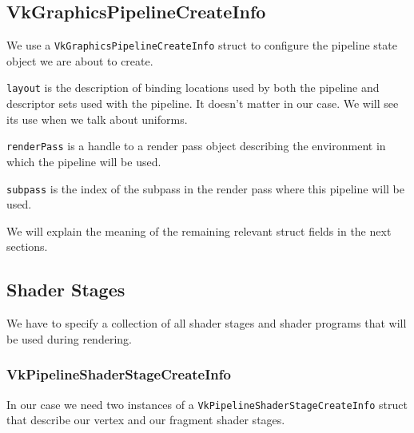 \subsection{VkGraphicsPipelineCreateInfo}

We use a \texttt{VkGraphicsPipelineCreateInfo} struct to configure the pipeline state
object we are about to create.

\texttt{layout} is the description of binding locations used by both the pipeline
and descriptor sets used with the pipeline.
It doesn't matter in our case.
We will see its use when we talk about uniforms.

\texttt{renderPass} is a handle to a render pass object describing the environment
in which the pipeline will be used.

\texttt{subpass} is the index of the subpass in the render pass where
this pipeline will be used.

We will explain the meaning of the remaining relevant struct fields
in the next sections.

\begin{minipage}{\linewidth}{\noindent}
    
\end{minipage}

\subsection{Shader Stages}

We have to specify a collection of all shader stages and shader programs that
will be used during rendering.

\begin{minipage}{\linewidth}{\noindent}
    
\end{minipage}

\subsubsection{VkPipelineShaderStageCreateInfo}

In our case we need two instances of a \texttt{VkPipelineShaderStageCreateInfo}
struct that describe our vertex and our fragment shader stages.

